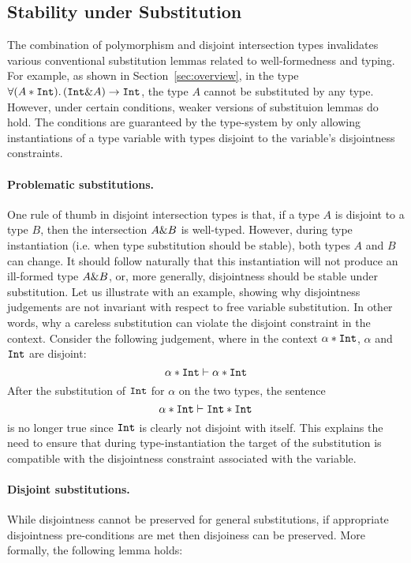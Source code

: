 \subsection{Stability under Substitution}
The combination of polymorphism and disjoint intersection types
invalidates various conventional substitution lemmas related to
well-formedness and typing.  
For example, as shown in Section~\ref{sec:overview}, in the type 
$\forall (A * \texttt{Int}).\, (\texttt{Int} \& A) \to \texttt{Int}$, the type $A$ cannot be substituted by any type.
However, under certain conditions, weaker versions of substituion lemmas do hold. 
The conditions are guaranteed by the type-system by only
allowing instantiations of a type variable with types disjoint to the
variable's disjointness constraints.

\paragraph{Problematic substitutions.}
One rule of thumb in disjoint intersection types is that, if a type
$A$ is disjoint to a type $B$, then the intersection $A \& B$ is
well-typed.  However, during type instantiation (i.e. when type
substitution should be stable), both types $A$ and $B$ can change.  It
should follow naturally that this instantiation will not produce an
ill-formed type $A \& B$, or, more generally, disjointness should
be stable under substitution.  Let us illustrate with an example,
showing why disjointness judgements are not invariant with respect to
free variable substitution.  In other words, why a careless
substitution can violate the disjoint constraint in the context.
Consider the following judgement, where in the context $\alpha
* \texttt{Int}$, $\alpha$ and $\texttt{Int}$ are disjoint:
\[ \alpha * \texttt{Int} \vdash \alpha * \texttt{Int} \]
After the substitution of $\texttt{Int}$ for $\alpha$ on the two types, the sentence
\[ \alpha * \texttt{Int} \vdash \texttt{Int} * \texttt{Int} \]
is no longer true since $\texttt{Int}$ is clearly not disjoint with itself.
This explains the need to ensure that during type-instantiation the target of the substitution  
is compatible with the disjointness constraint associated with the variable. 

\paragraph{Disjoint substitutions.}
While disjointness cannot be preserved for general substitutions,
if appropriate disjointness pre-conditions are met then disjoiness can
be preserved. More formally, the following lemma holds: 

